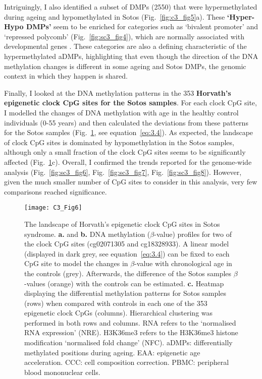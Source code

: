 Intriguingly, I also identified a subset of DMPs (2550) that were hypermethylated during ageing and hypomethylated in Sotos (Fig.~\ref{fig:c3_fig5}a). These \textbf{`Hyper-Hypo DMPs'} seem to be enriched for categories such as `bivalent promoter' and `repressed polycomb' (Fig.~\ref{fig:sc3_fig4}), which are normally associated with developmental genes \cite{Bernstein2006,Bernhart2016}. These categories are also a defining characteristic of the hypermethylated aDMPs, highlighting that even though the direction of the DNA methylation changes is different in some ageing and Sotos DMPs, the genomic context in which they happen is shared.

\bigskip

Finally, I looked at the DNA methylation patterns in the 353 \textbf{Horvath's epigenetic clock CpG sites for the Sotos samples}. For each clock CpG site, I modelled the changes of DNA methylation with age in the healthy control individuals (0-55 years) and then calculated the deviations from these patterns for the Sotos samples (Fig.~\ref{fig:c3_fig6}, see equation~\ref{eq:3.4}). As expected, the landscape of clock CpG sites is dominated by hypomethylation in the Sotos samples, although only a small fraction of the clock CpG sites seems to be significantly affected (Fig.~\ref{fig:c3_fig6}c). Overall, I confirmed the trends reported for the genome-wide analysis (Fig.~\ref{fig:sc3_fig6}, Fig.~\ref{fig:sc3_fig7}, Fig.~\ref{fig:sc3_fig8}). However, given the much smaller number of CpG sites to consider in this analysis, very few comparisons reached significance.

\begin{figure}[htbp!] 
	\centering    
	\texttt{[image: C3\_Fig6]}
	\vspace*{1 mm}
	\caption[Landscape of Horvath's epigenetic clock CpGs in Sotos syndrome]{The landscape of Horvath's epigenetic clock CpG sites in Sotos syndrome. \textbf{a.} and \textbf{b.} DNA methylation ($\beta$-value) profiles for two of the clock CpG sites (cg02071305 and cg18328933). A linear model (displayed in dark grey, see equation~\ref{eq:3.4}) can be fixed to each CpG site to model the changes in $\beta$-value with chronological age in the controls (grey). Afterwards, the difference of the Sotos samples $\beta$-values (orange) with the controls can be estimated. \textbf{c.} Heatmap displaying the differential methylation patterns for Sotos samples (rows) when compared with controls in each one of the 353 epigenetic clock CpGs (columns). Hierarchical clustering was performed in both rows and columns. RNA refers to the `normalised RNA expression' (NRE). H3K36me3 refers to the H3K36me3 histone modification `normalised fold change' (NFC). aDMPs: differentially methylated positions during ageing. EAA: epigenetic age acceleration. CCC: cell composition correction. PBMC: peripheral blood mononuclear cells.}
	\label{fig:c3_fig6}
\end{figure}

